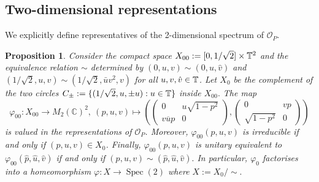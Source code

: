 \documentclass[12pt, a4paper]{amsart}
\def\Spec{\operatorname{Spec}}
\def\C{\mathbb{C}}
\newcommand{\CO}[0]{\mathcal{O}} \newcommand{\CP}[0]{\mathcal{P}}
\newtheorem{proposition}[theorem]{Proposition}
\numberwithin{equation}{section}
\begin{document}
\subsection{Two-dimensional representations}
We explicitly define representatives of the 2-dimensional spectrum of $\CO_P$.

\begin{proposition}
Consider the compact space $X_{00}:=[0,1/\sqrt 2]\times \mathbb{T}^2$ and the equivalence relation $\sim$ determined by $(0,u,v)\sim (0,u,\hat v)$  and
$(1/\sqrt{2}, u,v)\sim (1/\sqrt{2}, \bar{u}v^2, v)$ for all $u,v,\hat v\in\mathbb{T}$.
Let $X_0$ be the complement of the two circles $C_\pm:=\{(1/\sqrt 2,u,\pm u): u\in\mathbb{T}\}$ inside $X_{00}.$
The map 
$$\varphi_{00}:X_{00}\to M_2(\C)^2,\  (p,u,v)\mapsto \left(\begin{pmatrix} 0 & u\sqrt{1-p^2}\\ v\overline u p & 0 \end{pmatrix} , \begin{pmatrix}   0 & vp\\ \sqrt{1-p^2} & 0 \end{pmatrix}\right)$$
is valued in the representations of $\CO_P$. 
Moreover, $\varphi_{00}(p,u,v)$ is irreducible if and only if $(p,u,v)\in X_0$.
Finally, $\varphi_{00}(p,u,v)$ is unitary equivalent to $\varphi_{00}(\hat p,\hat u,\hat v)$ if and only if $(p,u,v)\sim (\hat p, \hat u, \hat v).$
In particular, $\varphi_0$ factorises into a homeomorphism $\varphi:X\to \Spec(2)$ where $X:=X_0/\sim.$
\end{proposition}
\end{document}
